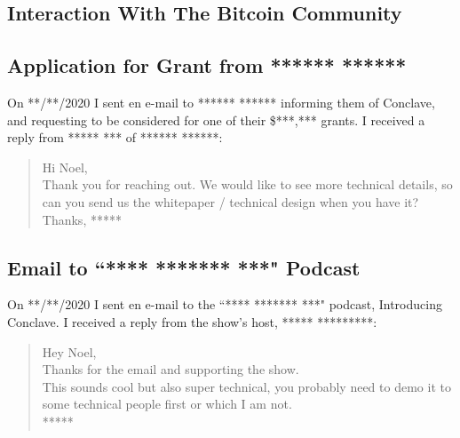 \documentclass{report}
\begin{document}
\begin{appendices}
  \chapter{Interaction With The Bitcoin Community}
  
  \section{Application for Grant from ****** ******}
  On **/**/2020 I sent en e-mail to ****** ****** informing them of Conclave, and requesting to be considered 
  for one of their \$***,*** grants. I received a reply from ***** *** of ****** ******: \\
  
  \begin{quote}
  Hi Noel, \\

  Thank you for reaching out. We would like to see more technical details, so can you send us the whitepaper / technical design when you have it? \\

  Thanks, 
 *****
  \end{quote}
  
  \section{Email to ``**** ******* ***" Podcast}
  On **/**/2020 I sent en e-mail to the ``**** ******* ***" podcast, Introducing Conclave. 
  I received a reply from the show's host, ***** *********: \\
  
  \begin{quote}
  Hey Noel, \\

  Thanks for the email and supporting the show. \\

  This sounds cool but also super technical, you probably need to demo it to some technical people first or which I am not. \\

  *****
  \end{quote}
  
  \clearpage

\end{appendices}
\end{document}
